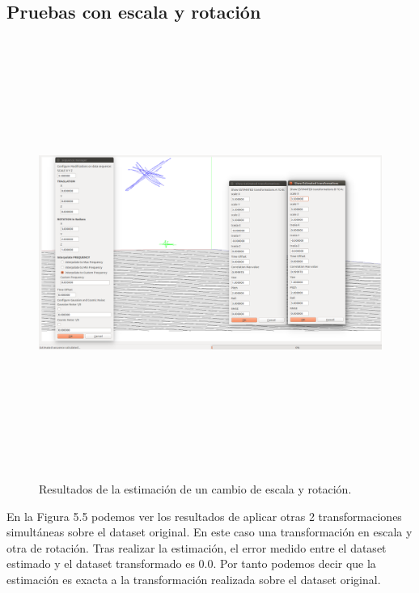 \subsection{Pruebas con escala y rotación}

\begin{figure}[H]
\begin{center}
\label{fig:escalaRotationTest}\includegraphics[height=14.0cm,width=18.0cm]{img/cap6/Escala_Rotation_abba.png}
\hspace{0.5cm}

\end{center}

\caption{Resultados de la estimación de un cambio de escala y rotación.}
\end{figure}
En la Figura 5.5 podemos ver los resultados de aplicar otras 2 transformaciones simultáneas sobre el dataset original. En este caso una transformación en escala y otra de rotación. Tras realizar la estimación, el error medido entre el dataset estimado y el dataset transformado es 0.0. Por tanto podemos decir que la estimación es exacta a la transformación realizada sobre el dataset original.

